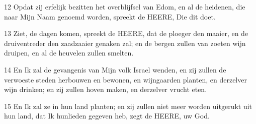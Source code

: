 \par 12 Opdat zij erfelijk bezitten het overblijfsel van Edom, en al de heidenen, die naar Mijn Naam genoemd worden, spreekt de HEERE, Die dit doet.
\par 13 Ziet, de dagen komen, spreekt de HEERE, dat de ploeger den maaier, en de druiventreder den zaadzaaier genaken zal; en de bergen zullen van zoeten wijn druipen, en al de heuvelen zullen smelten.
\par 14 En Ik zal de gevangenis van Mijn volk Israel wenden, en zij zullen de verwoeste steden herbouwen en bewonen, en wijngaarden planten, en derzelver wijn drinken; en zij zullen hoven maken, en derzelver vrucht eten.
\par 15 En Ik zal ze in hun land planten; en zij zullen niet meer worden uitgerukt uit hun land, dat Ik hunlieden gegeven heb, zegt de HEERE, uw God.




